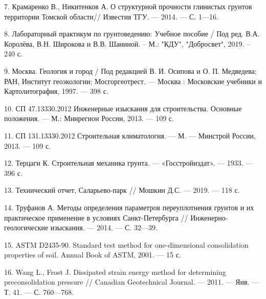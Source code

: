 7. Крамаренко В., Никитенков А. О структурной прочности глинистых грунтов
территории Томской области// Известия ТГУ. --- 2014. ---
С. 1---16.

8. Лабораторный практикум по грунтоведению: Учебное пособие / Под ред. В.А. Королёва, 
В.Н. Широкова и В.В. Шаниной. – М.: "КДУ"{}, "Добросвет"{}, 2019. – 240 с.

9. Москва. Геология и город / Под редакцией В. И. Осипова и О. П. Медведева; 
РАН, Институт геоэкологии; Мосгоргеотрест. --- Москва : Московские учебники 
и Картолитография, 1997. --- 398 с.

10. СП 47.13330.2012 Инженерные изыскания для строительства. 
Основные положения. --- М.: Минрегион России, 2013. --- 109 с.

11. СП 131.13330.2012 Строительная климатология. --- М. --- Минстрой России, 2013. --- 109 с.

12. Терцаги К. Строительная механика грунта. --- «Госстройиздат». ---
1933. --- 396 с.

13. Технический отчет, Саларьево-парк // Мошкин Д.С. --- 2019. --- 118 с.

14. Труфанов А. Методы определения параметров переуплотнения грунтов и
их практическое применение в условиях Санкт-Петербурга // Инженерно-
геологические изыскания. --- 2014. --- С. 32---39.

15. ASTM D2435-90. Standard test method for one-dimensional consolidation 
properties of soil. Annual Book of ASTM, 2001. --- 15 с.

16. Wang L., Frost J. Dissipated strain energy method for determining
preconsolidation pressure // Canadian Geotechnical Journal. — 2011. —
Янв. — Т. 41. — С. 760—768.